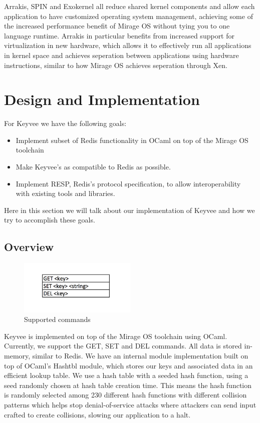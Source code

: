 \documentclass[english,10pt,twocolumn]{article}
\begin{document}
Arrakis\cite{arrakis}, SPIN\cite{spin} and Exokernel\cite{exokernel} all reduce shared kernel components and allow each application to have customized operating system management, achieving some of the increased performance benefit of Mirage OS without tying you to one language runtime.
Arrakis in particular benefits from increased support for virtualization in new hardware, which allows it to effectively run all applications in kernel space and achieves seperation between applications using hardware instructions, similar to how Mirage OS achieves seperation through Xen.




\section{Design and Implementation}
For Keyvee we have the following goals:
\begin{itemize}
  \item Implement subset of Redis functionality in OCaml on top of the Mirage OS toolchain
  \item Make Keyvee's as compatible to Redis as possible.
  \item Implement RESP, Redis's protocol specification, to allow interoperability with existing tools and libraries.
\end{itemize}

Here in this section we will talk about our implementation of Keyvee and how we try to accomplish these goals.

\subsection{Overview}

\begin{figure}[ht]
  \centering
  \caption{Supported commands}
  \includegraphics[width=0.5\textwidth]{images/commands}
\end{figure}

Keyvee is implemented on top of the Mirage OS toolchain using OCaml.
Currently, we support the GET, SET and DEL commands.
All data is stored in-memory, similar to Redis.
We have an internal module implementation built on top of OCaml's Hashtbl module, which stores our keys and associated data in an efficient lookup table.
We use a hash table with a seeded hash function, using a seed randomly chosen at hash table creation time.
This means the hash function is randomly selected among 230 different hash functions with different collision patterns which helps stop denial-of-service attacks where attackers can send input crafted to create collisions, slowing our application to a halt.
\end{document}

